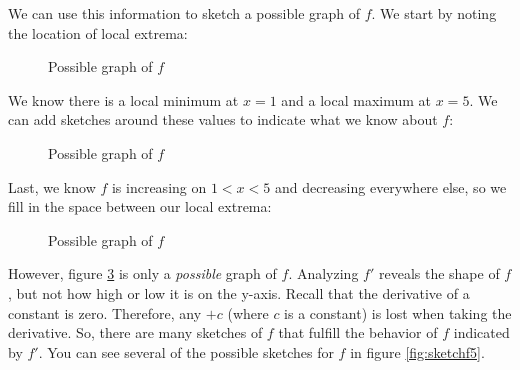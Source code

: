 We can use this information to sketch a possible graph of $f$. We start by 
noting the location of local extrema:
\begin{figure}[htbp]
	\centering
	\caption{Possible graph of $f$}
	\label{fig:sketchf2}
\end{figure}

We know there is a local minimum at $x=1$ and a local maximum at $x=5$. We can 
add sketches around these values to indicate what we know about $f$:
\begin{figure}[htbp]
	\centering
	\caption{Possible graph of $f$}
	\label{fig:sketchf3}
\end{figure}

Last, we know $f$ is increasing on $1<x<5$ and decreasing everywhere else, so 
we fill in the space between our local extrema:
\begin{figure}[htbp]
	\centering
	\caption{Possible graph of $f$}
	\label{fig:sketchf4}
\end{figure}

However, figure \ref{fig:sketchf4} is only a \textit{possible} graph of $f$. 
Analyzing $f'$ reveals the shape of $f$, but not how high or low it is on the 
y-axis. Recall that the derivative of a constant is zero. Therefore, any $+c$ 
(where $c$ is a constant) is lost when taking the derivative. So, there are 
many sketches of $f$ that fulfill the behavior of $f$ indicated by $f'$. You 
can see several of the possible sketches for $f$ in figure \ref{fig:sketchf5}. 

